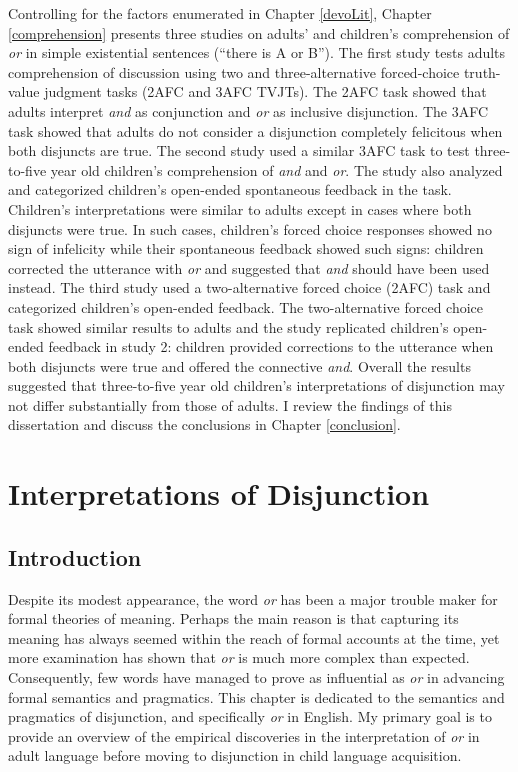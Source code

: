 \documentclass[oneside]{report}
\theoremstyle{definition}
\theoremstyle{definition}
\theoremstyle{definition}
\theoremstyle{remark}
\begin{document}
Controlling for the factors enumerated in Chapter \ref{devoLit}, Chapter
\ref{comprehension} presents three studies on adults' and children's
comprehension of \emph{or} in simple existential sentences (``there is A
or B''). The first study tests adults comprehension of discussion using
two and three-alternative forced-choice truth-value judgment tasks (2AFC
and 3AFC TVJTs). The 2AFC task showed that adults interpret \emph{and}
as conjunction and \emph{or} as inclusive disjunction. The 3AFC task
showed that adults do not consider a disjunction completely felicitous
when both disjuncts are true. The second study used a similar 3AFC task
to test three-to-five year old children's comprehension of \emph{and}
and \emph{or}. The study also analyzed and categorized children's
open-ended spontaneous feedback in the task. Children's interpretations
were similar to adults except in cases where both disjuncts were true.
In such cases, children's forced choice responses showed no sign of
infelicity while their spontaneous feedback showed such signs: children
corrected the utterance with \emph{or} and suggested that \emph{and}
should have been used instead. The third study used a two-alternative
forced choice (2AFC) task and categorized children's open-ended
feedback. The two-alternative forced choice task showed similar results
to adults and the study replicated children's open-ended feedback in
study 2: children provided corrections to the utterance when both
disjuncts were true and offered the connective \emph{and}. Overall the
results suggested that three-to-five year old children's interpretations
of disjunction may not differ substantially from those of adults. I
review the findings of this dissertation and discuss the conclusions in
Chapter \ref{conclusion}.

\chapter{Interpretations of Disjunction}\label{sempragLit}

\section{Introduction}\label{introduction-1}

Despite its modest appearance, the word \emph{or} has been a major
trouble maker for formal theories of meaning. Perhaps the main reason is
that capturing its meaning has always seemed within the reach of formal
accounts at the time, yet more examination has shown that \emph{or} is
much more complex than expected. Consequently, few words have managed to
prove as influential as \emph{or} in advancing formal semantics and
pragmatics. This chapter is dedicated to the semantics and pragmatics of
disjunction, and specifically \emph{or} in English. My primary goal is
to provide an overview of the empirical discoveries in the
interpretation of \emph{or} in adult language before moving to
disjunction in child language acquisition.
\end{document}
